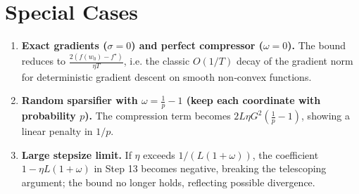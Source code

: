 \documentclass{article}
\begin{document}
\section*{Special Cases}
\begin{enumerate}[label=\alph*)]
\item \textbf{Exact gradients ($\sigma=0$) and perfect compressor ($\omega=0$).}  
The bound reduces to $\frac{2(f(w_0)-f^\star)}{\eta T}$, i.e. the classic $O(1/T)$ decay of the gradient norm for deterministic gradient descent on smooth non‑convex functions.

\item \textbf{Random sparsifier with $\omega=\frac{1}{p}-1$ (keep each coordinate with probability $p$).}  
The compression term becomes $2L\eta G^{2}(\frac{1}{p}-1)$, showing a linear penalty in $1/p$.

\item \textbf{Large stepsize limit.}  
If $\eta$ exceeds $1/(L(1+\omega))$, the coefficient $1-\eta L(1+\omega)$ in Step 13 becomes negative, breaking the telescoping argument; the bound no longer holds, reflecting possible divergence.
\end{enumerate}
\end{document}
